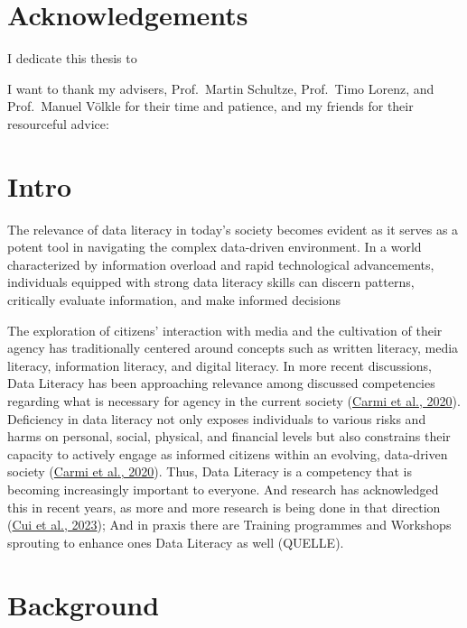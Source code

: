 \documentclass[
  12pt,
  a4paper,
  twoside]{article}
\begin{document}
\hypertarget{acknowledgements}{%
\section*{Acknowledgements}\label{acknowledgements}}

I dedicate this thesis to

I want to thank my advisers, Prof.~Martin Schultze, Prof.~Timo Lorenz, and Prof.~Manuel Völkle for their time and patience, and my friends for their resourceful advice:

\newpage\null\thispagestyle{empty}\newpage

\hypertarget{intro}{%
\section{Intro}\label{intro}}

The relevance of data literacy in today's society becomes evident as it serves as a potent tool in navigating the complex data-driven environment. In a world characterized by information overload and rapid technological advancements, individuals equipped with strong data literacy skills can discern patterns, critically evaluate information, and make informed decisions

The exploration of citizens' interaction with media and the cultivation of their agency has traditionally centered around concepts such as written literacy, media literacy, information literacy, and digital literacy. In more recent discussions, Data Literacy has been approaching relevance among discussed competencies regarding what is necessary for agency in the current society (\protect\hyperlink{ref-Carmi2020}{Carmi et al., 2020}). Deficiency in data literacy not only exposes individuals to various risks and harms on personal, social, physical, and financial levels but also constrains their capacity to actively engage as informed citizens within an evolving, data-driven society (\protect\hyperlink{ref-Carmi2020}{Carmi et al., 2020}). Thus, Data Literacy is a competency that is becoming increasingly important to everyone. And research has acknowledged this in recent years, as more and more research is being done in that direction (\protect\hyperlink{ref-Cui2023}{Cui et al., 2023}); And in praxis there are Training programmes and Workshops sprouting to enhance ones Data Literacy as well (QUELLE).

\hypertarget{background}{%
\section{Background}\label{background}}
\end{document}
